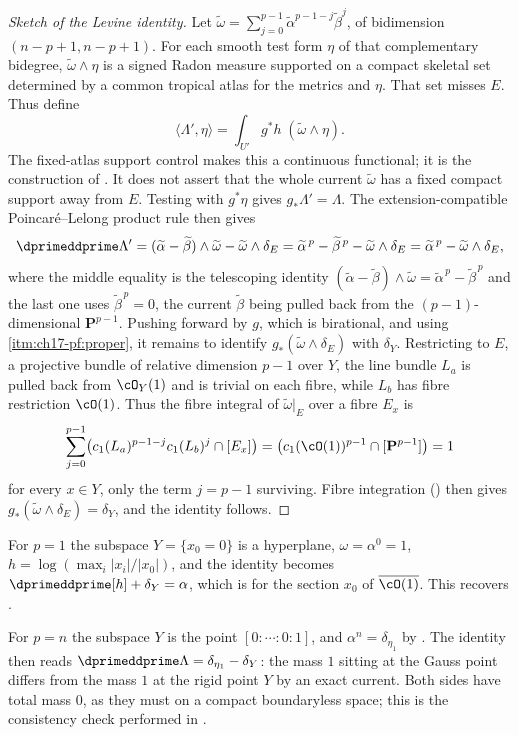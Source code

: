 \begin{proof}[Sketch of the Levine identity]
Let $\widetilde\omega=\sum_{j=0}^{p-1}\widetilde\alpha^{p-1-j}
\widetilde\beta^j$, of bidimension $(n-p+1,n-p+1)$.
For each smooth test form $\eta$ of that complementary bidegree,
$\widetilde\omega\wedge\eta$ is a signed Radon measure supported on
a compact skeletal set determined by a common tropical atlas for the
metrics and $\eta$.  That set misses $E$.  Thus define
\[
       \langle\Lambda',\eta\rangle
          =\int_{U'}g^*h\;(\widetilde\omega\wedge\eta).
\]
The fixed-atlas support control makes this a continuous functional;
it is the construction of \cite[\S18.7.4]{CLD25}.  It does not assert
that the whole current $\widetilde\omega$ has a fixed compact support
away from $E$.  Testing with $g^*\eta$ gives $g_*\Lambda'=\Lambda$.
The extension-compatible Poincar\'e--Lelong product rule
\cite[Proposition~18.3.9 and Theorem~18.7.5]{CLD25} then gives
\[
 \dprimeddprime\Lambda'
 =(\widetilde\alpha-\widetilde\beta)\wedge\widetilde\omega
  -\widetilde\omega\wedge\delta_E
 =\widetilde\alpha^{\,p}-\widetilde\beta^{\,p}
  -\widetilde\omega\wedge\delta_E
 =\widetilde\alpha^{\,p}-\widetilde\omega\wedge\delta_E,
\]
where the middle equality is the telescoping identity
$(\widetilde\alpha-\widetilde\beta)\wedge\widetilde\omega
 =\widetilde\alpha^{\,p}-\widetilde\beta^{\,p}$
and the last one uses $\widetilde\beta^{\,p}=0$, the current
$\widetilde\beta$ being pulled back from the $(p-1)$-dimensional
$\mathbf P^{p-1}$.
Pushing forward by $g$, which is birational, and using
\,\cref{itm:ch17-pf:proper}, it remains
to identify $g_*(\widetilde\omega\wedge\delta_E)$ with $\delta_Y$.
Restricting to $E$, a projective bundle of relative dimension $p-1$ over
$Y$, the line bundle $L_a$ is pulled back from $\cO_Y(1)$ and is
trivial on each fibre, while $L_b$ has fibre restriction $\cO(1)$.  Thus
the fibre integral of $\widetilde\omega|_E$ over a fibre $E_x$ is
\[
 \sum_{j=0}^{p-1}\bigl(c_1(L_a)^{p-1-j}c_1(L_b)^{j}\cap[E_x]\bigr)
 =\bigl(c_1(\cO(1))^{p-1}\cap[\mathbf P^{p-1}]\bigr)=1
\]
for every $x\in Y$, only the term $j=p-1$ surviving.  Fibre integration
() then gives
$g_*(\widetilde\omega\wedge\delta_E)=\delta_Y$, and the identity follows.
\end{proof}

\begin{example}
\label{ex:ch17-levine-extremes}
For $p=1$ the subspace $Y=\{x_0=0\}$ is a hyperplane,
$\omega=\alpha^0=1$, $h=\log(\max_i|x_i|/|x_0|)$, and the identity
becomes $\dprimeddprime[h]+\delta_Y=\alpha$, which is
 for the section $x_0$ of
$\overline{\cO(1)}$.  This recovers .

For $p=n$ the subspace $Y$ is the point $[0:\cdots:0:1]$, and
$\alpha^n=\delta_{\eta_1}$ by
.  The identity then reads
$\dprimeddprime\Lambda=\delta_{\eta_1}-\delta_{Y}$: the mass $1$ sitting
at the Gauss point differs from the mass $1$ at the rigid point $Y$ by
an exact current.  Both sides have total mass $0$, as they must on a
compact boundaryless space; this is the consistency check performed in
.
\end{example}

